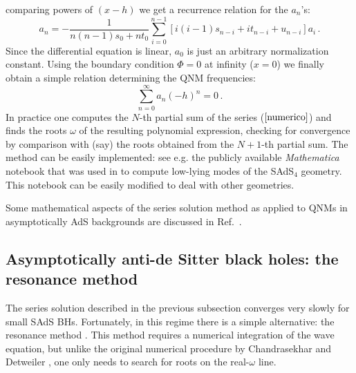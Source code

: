 \documentclass[]{iopart}
\def\be{\begin{equation}}
\def\ee{\end{equation}}
\begin{document}
comparing powers of $(x-h)$ we get a recurrence relation for the $a_n$'s:
%
\be a_n=-\frac{1}{n(n-1)s_0+nt_0}\sum_{i=0}^{n-1}\left
[i(i-1)s_{n-i}+it_{n-i}+u_{n-i} \right ]a_i\,. \ee
%
Since the differential equation is linear, $a_0$ is just an arbitrary
normalization constant. Using the boundary condition $\Phi=0$ at infinity
($x=0$) we finally obtain a simple relation determining the QNM frequencies:
%
\begin{equation}
\sum_{n=0}^{\infty} a_{n}(-h)^n=0 \,. \label{numerico}
\end{equation}
%
In practice one computes the $N$-th partial sum of the series
($\ref{numerico}$) and finds the roots $\omega$ of the resulting polynomial
expression, checking for convergence by comparison with (say) the roots
obtained from the $N+1$-th partial sum. The method can be easily implemented:
see e.g. the publicly available {\it Mathematica} notebook \cite{rdweb} that
was used in \cite{Cardoso:2001bb} to compute low-lying modes of the SAdS$_4$
geometry. This notebook can be easily modified to deal with other geometries.

Some mathematical aspects of the series solution method as applied to QNMs in
asymptotically AdS backgrounds are discussed in Ref.~\cite{Starinets:2002br}.

\subsection{\label{sec:resonance}Asymptotically anti-de Sitter black holes: the resonance method}

The series solution described in the previous subsection converges very slowly
for small SAdS BHs.  Fortunately, in this regime there is a simple
alternative: the resonance method \cite{Berti:2009wx}.  This method requires a
numerical integration of the wave equation, but unlike the original numerical
procedure by Chandrasekhar and Detweiler \cite{Chandrasekhar:1975qn}, one only
needs to search for roots on the real-$\omega$ line.
\end{document}
